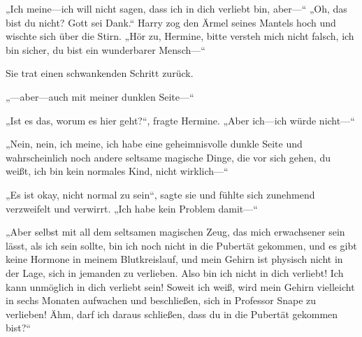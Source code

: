 „Ich meine—ich will nicht sagen, dass ich in dich verliebt bin, aber—“
„Oh, das bist du nicht? Gott sei Dank.“
Harry zog den Ärmel seines Mantels hoch und wischte sich über die Stirn.
„Hör zu, Hermine, bitte versteh mich nicht falsch, ich bin sicher, du bist ein wunderbarer Mensch—“

Sie trat einen schwankenden Schritt zurück.

„—aber—auch mit meiner dunklen Seite—“

„Ist es das, worum es hier geht?“, fragte Hermine. „Aber ich—ich würde nicht—“

„Nein, nein, ich meine, ich habe eine geheimnisvolle dunkle Seite und wahrscheinlich noch andere seltsame magische Dinge, die vor sich gehen, du weißt, ich bin kein normales Kind, nicht wirklich—“

„Es ist okay, nicht normal zu sein“, sagte sie und fühlte sich zunehmend verzweifelt und verwirrt. „Ich habe kein Problem damit—“

„Aber selbst mit all dem seltsamen magischen Zeug, das mich erwachsener sein lässt, als ich sein sollte, bin ich noch nicht in die Pubertät gekommen, und es gibt keine Hormone in meinem Blutkreislauf, und mein Gehirn ist physisch nicht in der Lage, sich in jemanden zu verlieben. Also bin ich nicht in dich verliebt! Ich kann unmöglich in dich verliebt sein! Soweit ich weiß, wird mein Gehirn vielleicht in sechs Monaten aufwachen und beschließen, sich in Professor Snape zu verlieben! Ähm, darf ich daraus schließen, dass du in die Pubertät gekommen bist?“

